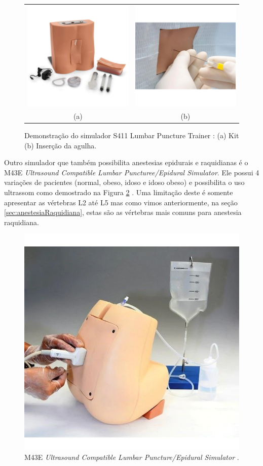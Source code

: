 \begin{figure}[ht!]
    \centering
        \begin{tabular}{cc}
        \includegraphics[width=0.3\linewidth]{capitulos/figuras/S411-Lumbar Puncture Trainer Kit.png} & 
        \includegraphics[width=0.3\linewidth]{capitulos/figuras/S411-Lumbar Puncture Trainer Needle.png} 
        \\
        (a) & (b)
        \end{tabular}
    \caption{Demonstração do simulador S411 Lumbar Puncture Trainer \cite{GaumardScientific}: (a) Kit (b) Inserção da agulha.}
    \label{fig:simuladorS411}
\end{figure}

Outro simulador que também possibilita anestesias epidurais e raquidianas é o M43E \textit{Ultrasound Compatible Lumbar Puncturee/Epidural Simulator}. Ele possui 4 variações de pacientes (normal, obeso, idoso e idoso obeso) e possibilita o uso ultrassom como demostrado na Figura \ref{fig:M43ESimulator} . Uma limitação deste é somente apresentar as vértebras L2 até L5 \cite{KyotoKagaku2015}mas como vimos anteriormente, na seção \ref{sec:anestesiaRaquidiana}, estas são as vértebras mais comuns para anestesia raquidiana.

\begin{figure}[ht!]
    \centering
    \includegraphics[width=0.3\linewidth]{capitulos/figuras/M43E Simulator.png} 
    \caption{M43E \textit{Ultrasound Compatible Lumbar Puncture/Epidural Simulator} \cite{KyotoKagaku2015}.}
    \label{fig:M43ESimulator}
\end{figure}

